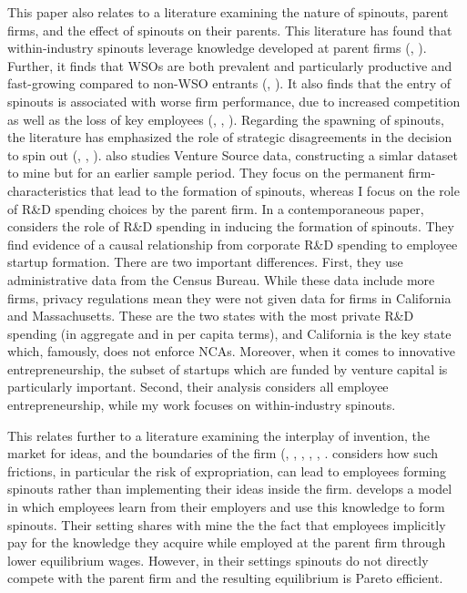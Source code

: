 \documentclass[11pt,english]{article}
\theoremstyle{definition}
\begin{document}
This paper also relates to a literature examining the nature of spinouts, parent firms, and the effect of spinouts on their parents. This literature has found that within-industry spinouts leverage knowledge developed at parent firms (\cite{klepper_capabilities_2002}, \cite{agarwal_knowledge_2002}). Further, it finds that WSOs are both prevalent and particularly productive and fast-growing compared to non-WSO entrants (\cite{muendler_employee_2012}, \cite{baslandze_spinout_2019}). It also finds that the entry of spinouts is associated with worse firm performance, due to increased competition as well as the loss of key employees (\cite{wezel_competitive_2006}, \cite{campbell_who_2012}, \cite{agarwal_what_2013}). Regarding the spawning of spinouts, the literature has emphasized the role of strategic disagreements in the decision to spin out (\cite{klepper_entry_2005}, \cite{klepper_disagreements_2007}, \cite{klepper_disagreements_2010}). \cite{gompers_entrepreneurial_2005} also studies Venture Source data, constructing a simlar dataset to mine but for an earlier sample period. They focus on the permanent firm-characteristics that lead to the formation of spinouts, whereas I focus on the role of R\&D spending choices by the parent firm. In a contemporaneous paper, \cite{babina_entrepreneurial_2019} considers the role of R\&D spending in inducing the formation of spinouts. They find evidence of a causal relationship from corporate R\&D spending to employee startup formation. There are two important differences. First, they use administrative data from the Census Bureau. While these data include more firms, privacy regulations mean they were not given data for firms in California and Massachusetts. These are the two states with the most private R\&D spending (in aggregate and in per capita terms), and California is the key state which, famously, does not enforce NCAs. Moreover, when it comes to innovative entrepreneurship, the subset of startups which are funded by venture capital is particularly important. Second, their analysis considers all employee entrepreneurship, while my work focuses on within-industry spinouts.

This relates further to a literature examining the interplay of invention, the market for ideas, and the boundaries of the firm (\cite{arrow_economic_1962}, \cite{anton_expropriation_1994}, \cite{anton_sale_2002}, \cite{anton_start-ups_1995}, \cite{franco_spin-outs_2006}, \cite{chatterjee_spinoffs_2012}. \cite{anton_start-ups_1995} considers how such frictions, in particular the risk of expropriation, can lead to employees forming spinouts rather than implementing their ideas inside the firm. \cite{franco_spin-outs_2006} develops a model in which employees learn from their employers and use this knowledge to form spinouts. Their setting shares with mine the the fact that employees implicitly pay for the knowledge they acquire while employed at the parent firm through lower equilibrium wages. However, in their settings spinouts do not directly compete with the parent firm and the resulting equilibrium is Pareto efficient. 
\end{document}
